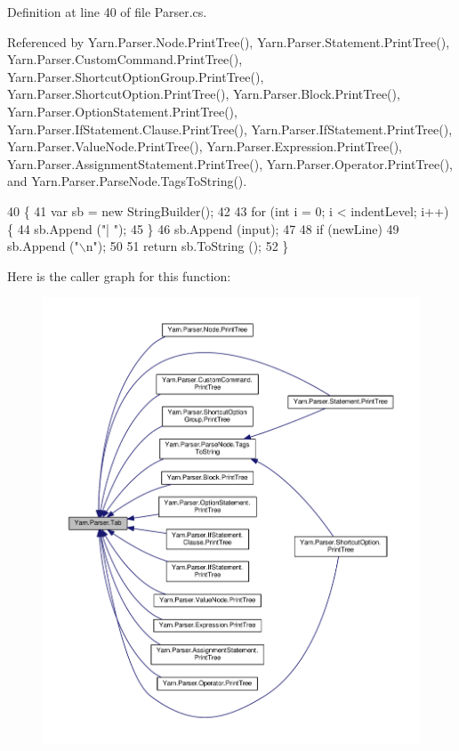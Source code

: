 Definition at line 40 of file Parser.\-cs.



Referenced by Yarn.\-Parser.\-Node.\-Print\-Tree(), Yarn.\-Parser.\-Statement.\-Print\-Tree(), Yarn.\-Parser.\-Custom\-Command.\-Print\-Tree(), Yarn.\-Parser.\-Shortcut\-Option\-Group.\-Print\-Tree(), Yarn.\-Parser.\-Shortcut\-Option.\-Print\-Tree(), Yarn.\-Parser.\-Block.\-Print\-Tree(), Yarn.\-Parser.\-Option\-Statement.\-Print\-Tree(), Yarn.\-Parser.\-If\-Statement.\-Clause.\-Print\-Tree(), Yarn.\-Parser.\-If\-Statement.\-Print\-Tree(), Yarn.\-Parser.\-Value\-Node.\-Print\-Tree(), Yarn.\-Parser.\-Expression.\-Print\-Tree(), Yarn.\-Parser.\-Assignment\-Statement.\-Print\-Tree(), Yarn.\-Parser.\-Operator.\-Print\-Tree(), and Yarn.\-Parser.\-Parse\-Node.\-Tags\-To\-String().


\begin{DoxyCode}
40                                                                                       \{
41             var sb = \textcolor{keyword}{new} StringBuilder();
42 
43             \textcolor{keywordflow}{for} (\textcolor{keywordtype}{int} i = 0; i < indentLevel; i++) \{
44                 sb.Append (\textcolor{stringliteral}{"| "});
45             \}
46             sb.Append (input);
47 
48             \textcolor{keywordflow}{if} (newLine)
49                 sb.Append (\textcolor{stringliteral}{"\(\backslash\)n"});
50 
51             \textcolor{keywordflow}{return} sb.ToString ();
52         \}
\end{DoxyCode}


Here is the caller graph for this function\-:
\nopagebreak
\begin{figure}[H]
\begin{center}
\leavevmode
\includegraphics[width=350pt]{a00139_aa8fa36b46de12a1c561d77b99c4b9ae3_icgraph}
\end{center}
\end{figure}





